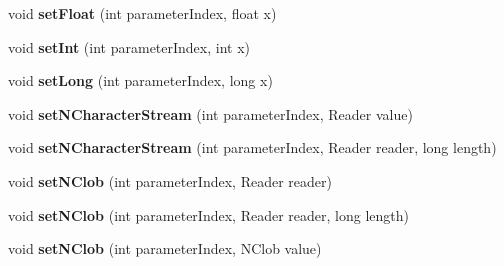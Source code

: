 \begin{DoxyCompactItemize}
\mbox{\label{classcom_1_1mysql_1_1cj_1_1_client_prepared_query_bindings_a386f694bae887eb53303f921e667d1c9}} 
void {\bfseries set\+Float} (int parameter\+Index, float x)
\item 
\mbox{\label{classcom_1_1mysql_1_1cj_1_1_client_prepared_query_bindings_a2d9f72462351602df67d21f44b21e7bf}} 
void {\bfseries set\+Int} (int parameter\+Index, int x)
\item 
\mbox{\label{classcom_1_1mysql_1_1cj_1_1_client_prepared_query_bindings_a727ac913d960b4a22ad2da365b50fcdd}} 
void {\bfseries set\+Long} (int parameter\+Index, long x)
\item 
\mbox{\label{classcom_1_1mysql_1_1cj_1_1_client_prepared_query_bindings_a8bb0427c0f31b94ac05615bad5c7244c}} 
void {\bfseries set\+N\+Character\+Stream} (int parameter\+Index, Reader value)
\item 
\mbox{\label{classcom_1_1mysql_1_1cj_1_1_client_prepared_query_bindings_a151f68913c4eceb8eb02b3b02c8a28cf}} 
void {\bfseries set\+N\+Character\+Stream} (int parameter\+Index, Reader reader, long length)
\item 
\mbox{\label{classcom_1_1mysql_1_1cj_1_1_client_prepared_query_bindings_a042474c200f8ba611b9bb62ee46b0c72}} 
void {\bfseries set\+N\+Clob} (int parameter\+Index, Reader reader)
\item 
\mbox{\label{classcom_1_1mysql_1_1cj_1_1_client_prepared_query_bindings_ae63f1680061ba971f2c7421aa424a012}} 
void {\bfseries set\+N\+Clob} (int parameter\+Index, Reader reader, long length)
\item 
\mbox{\label{classcom_1_1mysql_1_1cj_1_1_client_prepared_query_bindings_a2ce7b7fc5dff1f2b5358c6a398983eba}} 
void {\bfseries set\+N\+Clob} (int parameter\+Index, N\+Clob value)

\end{DoxyCompactItemize}
